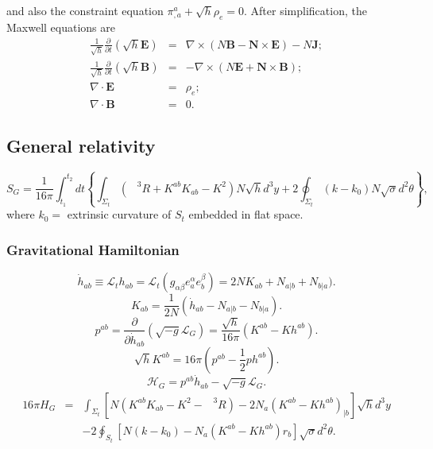 \begin{example}
and also the constraint equation $\pi^a_{,a} + \sqrt{h}\rho_e = 0$.
After simplification, the Maxwell equations are
\begin{eqnarray}
\frac{1}{\sqrt{h}}\frac{\partial}{\partial t}(\sqrt{h} \bm{E}) &=& \nabla \times (N \bm{B} - \bm{N} \times \bm{E}) - N \bm{J}; \nonumber \\
\frac{1}{\sqrt{h}}\frac{\partial}{\partial t}(\sqrt{h} \bm{B}) &=& -\nabla \times (N \bm{E} + \bm{N} \times \bm{B}) ;\nonumber \\
\nabla \cdot \bm{E} &=& \rho_e ;\nonumber \\
\nabla \cdot \bm{B} &=& 0. \nonumber
\end{eqnarray}
\end{example}


\subsection{General relativity}
\[S_G = \frac{1}{16 \pi} \int_{t_1}^{t_2} dt \left\{ \int_{\Sigma_t} \left(\phantom{R}^3R + K^{ab}K_{ab} -K^2 \right) N \sqrt{h} d^3 y + 2\oint_{\Sigma_t}(k-k_0)N \sqrt{\sigma}d^2 \theta \right\} ,\]
where $k_0 =$ extrinsic curvature of $S_t$ embedded in flat space. 

\subsubsection{Gravitational Hamiltonian}
\[\dot{h}_{ab} \equiv \mathcal{L}_t h_{ab} = \mathcal{L}_t (g_{\alpha \beta} e_a^{\alpha} e_b^{\beta}) =  2NK_{ab} + N_{a|b} + N_{b|a}).\]
\[K_{ab} = \frac{1}{2N} (\dot{h}_{ab} - N_{a|b} - N_{b|a}).\]
\[p^{ab} = \frac{\partial}{\partial \dot{h}_{ab}} (\sqrt{-g} \mathcal{L}_G) = \frac{\sqrt{h}}{16\pi} (K^{ab} - K h^{ab}).\]
\[\sqrt{h}K^{ab} = 16\pi (p^{ab} - \frac{1}{2}ph^{ab}).\]
\[\mathcal{H}_G = p^{ab}\dot{h}_{ab} - \sqrt{-g} \mathcal{L}_G.\]
\begin{eqnarray}
16\pi H_G &=& \int_{\Sigma_t} \left[ N(K^{ab}K_{ab} - K^2 - \phantom{R}^3R) - 2N_a(K^{ab} - Kh^{ab})_{|b} \right] \sqrt{h} d^3 y 
\nonumber \\
&\phantom{=}& -2\oint_{S_t} \left[ N(k-k_0) - N_a(K^{ab}-Kh^{ab})r_b \right] \sqrt{\sigma} d^2 \theta .\nonumber
\end{eqnarray}

